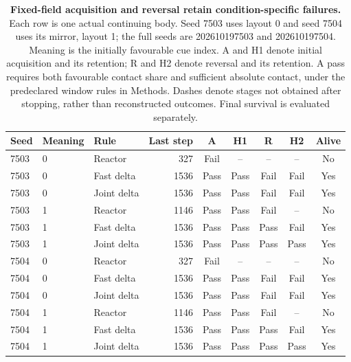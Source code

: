 \begin{table}[p]
\centering\small
\caption{\textbf{Fixed-field acquisition and reversal retain condition-specific failures.} Each row is one actual continuing body. Seed 7503 uses layout 0 and seed 7504 uses its mirror, layout 1; the full seeds are 202610197503 and 202610197504. Meaning is the initially favourable cue index. A and H1 denote initial acquisition and its retention; R and H2 denote reversal and its retention. A pass requires both favourable contact share and sufficient absolute contact, under the predeclared window rules in Methods. Dashes denote stages not obtained after stopping, rather than reconstructed outcomes. Final survival is evaluated separately.}
\label{tab:self-contact}
\begin{tabular}{lllrccccc}
\toprule
Seed & Meaning & Rule & Last step & A & H1 & R & H2 & Alive\\
\midrule
7503 & 0 & Reactor & 327 & Fail & -- & -- & -- & No\\
7503 & 0 & Fast delta & 1536 & Pass & Pass & Fail & Fail & Yes\\
7503 & 0 & Joint delta & 1536 & Pass & Pass & Fail & Fail & Yes\\
7503 & 1 & Reactor & 1146 & Pass & Pass & Fail & -- & No\\
7503 & 1 & Fast delta & 1536 & Pass & Pass & Pass & Fail & Yes\\
7503 & 1 & Joint delta & 1536 & Pass & Pass & Pass & Pass & Yes\\
7504 & 0 & Reactor & 327 & Fail & -- & -- & -- & No\\
7504 & 0 & Fast delta & 1536 & Pass & Pass & Fail & Fail & Yes\\
7504 & 0 & Joint delta & 1536 & Pass & Pass & Fail & Fail & Yes\\
7504 & 1 & Reactor & 1146 & Pass & Pass & Fail & -- & No\\
7504 & 1 & Fast delta & 1536 & Pass & Pass & Pass & Fail & Yes\\
7504 & 1 & Joint delta & 1536 & Pass & Pass & Pass & Pass & Yes\\
\bottomrule
\end{tabular}
\end{table}

